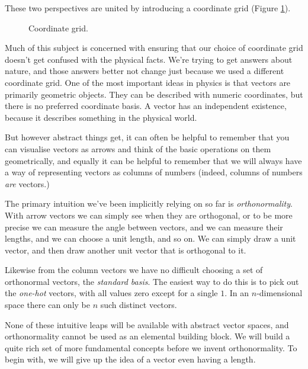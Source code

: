 These two perspectives are united by introducing a coordinate grid (Figure \ref{fig:vector-coordinate-grid}).

\begin{figure}[h]
    \centering
    \caption{Coordinate grid.} \label{fig:vector-coordinate-grid}
\end{figure}

Much of this subject is concerned with ensuring that our choice of coordinate grid doesn't get confused with the physical facts. We're trying to get answers about nature, and those answers better not change just because we used a different coordinate grid. One of the most important ideas in physics is that vectors are primarily geometric objects. They can be described with numeric coordinates, but there is no preferred coordinate basis. A vector has an independent existence, because it describes something in the physical world.

But however abstract things get, it can often be helpful to remember that you can visualise vectors as arrows and think of the basic operations on them geometrically, and equally it can be helpful to remember that we will always have a way of representing vectors as columns of numbers (indeed, columns of numbers \textit{are} vectors.)

The primary intuition we've been implicitly relying on so far is \textit{orthonormality}. With arrow vectors we can simply see when they are orthogonal, or to be more precise we can measure the angle between vectors, and we can measure their lengths, and we can choose a unit length, and so on. We can simply draw a unit vector, and then draw another unit vector that is orthogonal to it.

Likewise from the column vectors we have no difficult choosing a set of orthonormal vectors, the \textit{standard basis}. The easiest way to do this is to pick out the \textit{one-hot} vectors, with all values zero except for a single $1$. In an $n$-dimensional space there can only be $n$ such distinct vectors.

None of these intuitive leaps will be available with abstract vector spaces, and orthonormality cannot be used as an elemental building block. We will build a quite rich set of more fundamental concepts before we invent orthonormality. To begin with, we will give up the idea of a vector even having a length.

